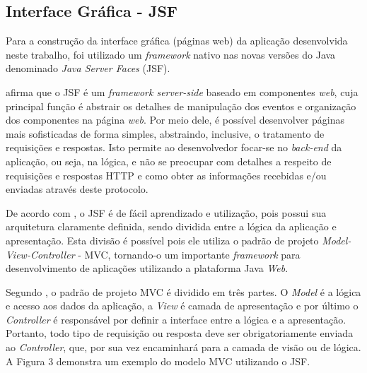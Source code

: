  

\subsection{Interface Gráfica - JSF}


\par Para a construção da interface gráfica (páginas web) da aplicação
desenvolvida neste trabalho, foi utilizado um \textit{framework} nativo nas
novas versões do Java denominado \textit{Java Server Faces} (JSF).

\par {} afirma que o JSF é um
\textit{framework server-side} baseado em componentes \textit{web}, cuja principal função é abstrair os detalhes de manipulação dos eventos e organização dos componentes na página \textit{web}. 
Por meio dele, é possível desenvolver páginas mais sofisticadas de forma
simples, abstraindo, inclusive, o tratamento de requisições e respostas. Isto permite ao desenvolvedor focar-se no \textit{back-end} da aplicação, ou seja, na lógica, e não se preocupar com detalhes a respeito de requisições e respostas HTTP e como obter as informações recebidas e/ou enviadas através deste protocolo.

\par De acordo com , o
JSF é de fácil aprendizado e utilização, pois possui sua arquitetura claramente definida, sendo dividida entre a lógica da aplicação e apresentação. Esta divisão é possível pois ele utiliza o padrão de projeto \textit{Model-View-Controller} - MVC\footnotemark[3], tornando-o um importante \textit{framework} para desenvolvimento de aplicações utilizando a plataforma Java \textit{Web}.


\par Segundo
, 
o padrão de projeto MVC é dividido em três partes. O \textit{Model} é a lógica e
acesso aos dados da aplicação, a \textit{View} é camada de apresentação e por
último o \textit{Controller} é responsável por definir a interface entre a lógica e a apresentação. Portanto, todo tipo de requisição ou resposta deve ser obrigatoriamente enviada 
ao \textit{Controller}, que, por sua vez encaminhará para a camada de visão ou de lógica. A Figura 3 demonstra um 
exemplo do modelo MVC utilizando o JSF.

